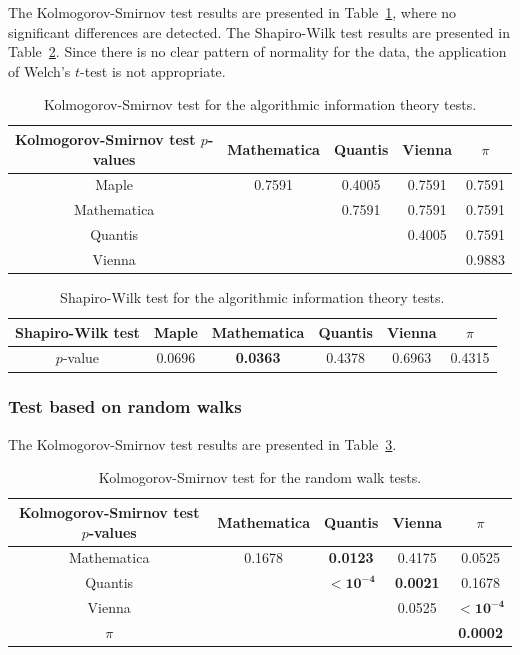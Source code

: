 \documentclass[%
 preprint,
 showpacs,
 showkeys,
 preprintnumbers,
 amsmath,amssymb,
 aps,
 prl,
  longbibliography,
 ]{revtex4-1}
\begin{document}
The Kolmogorov-Smirnov test results are presented in Table~\ref{tab:11},
where no significant differences are detected.
The Shapiro-Wilk test results are presented in Table~\ref{tab:12}.
Since there is no clear
pattern of normality for the data, the application of Welch's $t$-test is not
appropriate.


\begin{table}
\caption{Kolmogorov-Smirnov test for the algorithmic information theory tests.}\label{tab:11}
 \begin{center}
 \begin{tabular}
[c]{ c c c c c }
\hline\hline
Kolmogorov-Smirnov test $p$-values & Mathematica & Quantis & Vienna & $\pi$ \\\hline
Maple  & 0.7591 & 0.4005 & 0.7591 & 0.7591\\
Mathematica &  & 0.7591 & 0.7591 & 0.7591\\
Quantis &  &  & 0.4005 & 0.7591\\
Vienna &  &  &  & 0.9883\\\hline\hline
\end{tabular}
\end{center}
\end{table}



\begin{table}
\caption{Shapiro-Wilk test for the algorithmic information theory tests.}\label{tab:12}
\begin{center}
\begin{tabular}
[c]{ c c c c c c }\hline\hline
Shapiro-Wilk test & Maple & Mathematica & Quantis  & Vienna  & $\pi$\\\hline
$p$-value & 0.0696 & \bf{0.0363} &
0.4378 & 0.6963 & 0.4315\\\hline\hline
\end{tabular}
\end{center}
\end{table}


\subsubsection{Test based on random walks}


The Kolmogorov-Smirnov test results are presented in Table~\ref{tab:13}.

\begin{table}
\caption{Kolmogorov-Smirnov test for the random walk tests.}\label{tab:13}
 \begin{center}
 \begin{tabular}
[c]{ c c c c c }
\hline\hline
Kolmogorov-Smirnov test $p$-values & Mathematica & Quantis & Vienna & $\pi$ \\\hline
Mathematica & 0.1678 & \bf{0.0123} & 0.4175 & 0.0525\\
Quantis &  & $\mathbf{< 10^{-4}}$ & \bf{0.0021} & 0.1678\\
Vienna &  &  & 0.0525 & $\mathbf{< 10^{-4}}$\\
$\pi$ &  &  &  & \bf{0.0002}\\\hline\hline
\end{tabular}
\end{center}
\end{table}
\end{document}
